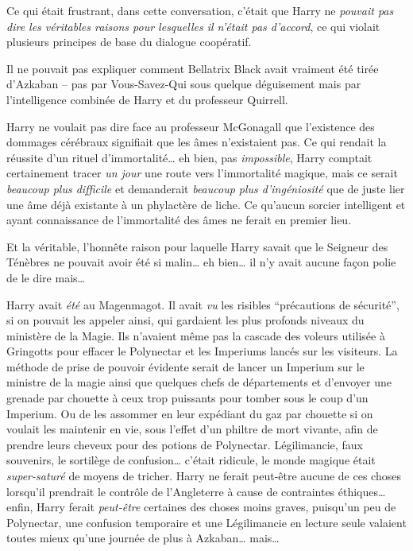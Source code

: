 \later

Ce qui était frustrant, dans cette conversation, c'était que Harry ne \emph{pouvait pas dire les véritables raisons pour lesquelles il n'était pas d'accord}, ce qui violait plusieurs principes de base du dialogue coopératif.

Il ne pouvait pas expliquer comment Bellatrix Black avait vraiment été tirée d'Azkaban -- pas par Vous-Savez-Qui sous quelque déguisement mais par l'intelligence combinée de Harry et du professeur Quirrell.

Harry ne voulait pas dire face au professeur McGonagall que l'existence des dommages cérébraux signifiait que les âmes n'existaient pas. Ce qui rendait la réussite d'un rituel d'immortalité… eh bien, pas \emph{impossible}, Harry comptait certainement tracer \emph{un jour} une route vers l'immortalité magique, mais ce serait \emph{beaucoup plus difficile} et demanderait \emph{beaucoup plus d'ingéniosité} que de juste lier une âme déjà existante à un phylactère de liche. Ce qu'aucun sorcier intelligent et ayant connaissance de l'immortalité des âmes ne ferait en premier lieu.

Et la véritable, l'honnête raison pour laquelle Harry savait que le Seigneur des Ténèbres ne pouvait avoir été si malin… eh bien… il n'y avait aucune façon polie de le dire mais…

Harry avait \emph{été} au Magenmagot. Il avait \emph{vu} les risibles “précautions de sécurité”, si on pouvait les appeler ainsi, qui gardaient les plus profonds niveaux du ministère de la Magie. Ils n'avaient même pas la cascade des voleurs utilisée à Gringotts pour effacer le Polynectar et les Imperiums lancés sur les visiteurs. La méthode de prise de pouvoir évidente serait de lancer un Imperium sur le ministre de la magie ainsi que quelques chefs de départements et d'envoyer une grenade par chouette à ceux trop puissants pour tomber sous le coup d'un Imperium. Ou de les assommer en leur expédiant du gaz par chouette si on voulait les maintenir en vie, sous l'effet d'un philtre de mort vivante, afin de prendre leurs cheveux pour des potions de Polynectar. Légilimancie, faux souvenirs, le sortilège de confusion… c'était ridicule, le monde magique était \emph{super-saturé} de moyens de tricher. Harry ne ferait peut-être aucune de ces choses lorsqu'il prendrait le contrôle de l'Angleterre à cause de contraintes éthiques… enfin, Harry ferait \emph{peut-être} certaines des choses moins graves, puisqu'un peu de Polynectar, une confusion temporaire et une Légilimancie en lecture seule valaient toutes mieux qu'une journée de plus à Azkaban… mais…

